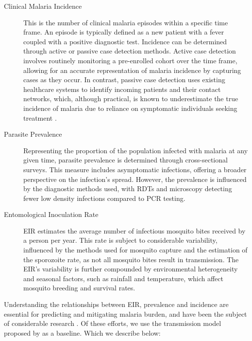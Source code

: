 \documentclass[11pt]{article}
\begin{document}
\begin{thesisquote}
\begin{description}
    \item[Clinical Malaria Incidence] This is the number of clinical malaria episodes within a specific time frame. An episode is typically defined as a new patient with a fever coupled with a positive diagnostic test. Incidence can be determined through active or passive case detection methods. Active case detection involves routinely monitoring a pre-enrolled cohort over the time frame, allowing for an accurate representation of malaria incidence by capturing cases as they occur. In contrast, passive case detection uses existing healthcare systems to identify incoming patients and their contact networks, which, although practical, is known to underestimate the true incidence of malaria due to reliance on symptomatic individuals seeking treatment \citet{rios-zertuche_performance_2021}.
    \item[Parasite Prevalence]
    Representing the proportion of the population infected with malaria at any given time, parasite prevalence is determined through cross-sectional surveys. This measure includes asymptomatic infections, offering a broader perspective on the infection's spread. However, the prevalence is influenced by the diagnostic methods used, with  RDTs and microscopy detecting fewer low density infections compared to PCR testing. 
    \item[Entomological Inoculation Rate]
    EIR estimates the average number of infectious mosquito bites received by a person per year. This rate is subject to considerable variability, influenced by the methods used for mosquito capture and the estimation of the sporozoite rate, as not all mosquito bites result in transmission. The EIR's variability is further compounded by environmental heterogeneity and seasonal factors, such as rainfall and temperature, which affect mosquito breeding and survival rates.
\end{description}
\end{thesisquote}

Understanding the relationships between EIR, prevalence and incidence are essential for predicting and mitigating malaria burden, and have been the subject of considerable research \citet{griffin_estimates_2014,griffin_is_2016,cameron_defining_2015,reiker_emulator-based_2021}. Of these efforts, we use the transmission model proposed by \citet{griffin_estimates_2014} as a baseline. Which we describe below:
\end{document}
